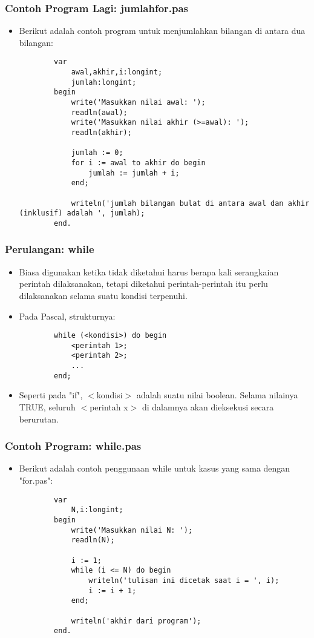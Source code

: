 \documentclass{beamer}
\begin{document}
\begin{frame}[fragile]
\frametitle{Contoh Program Lagi: jumlahfor.pas}
\begin{itemize}
	\item Berikut adalah contoh program untuk menjumlahkan bilangan di antara dua bilangan:
	\begin{lstlisting}
		var
		    awal,akhir,i:longint;
		    jumlah:longint;
		begin
		    write('Masukkan nilai awal: ');
		    readln(awal);
		    write('Masukkan nilai akhir (>=awal): ');
		    readln(akhir);
		
		    jumlah := 0;
		    for i := awal to akhir do begin
		        jumlah := jumlah + i;
		    end;
		
		    writeln('jumlah bilangan bulat di antara awal dan akhir (inklusif) adalah ', jumlah);
		end.
	\end{lstlisting}
\end{itemize}
\end{frame}

\begin{frame}[fragile]
\frametitle{Perulangan: while}
\begin{itemize}
	\item Biasa digunakan ketika tidak diketahui harus berapa kali serangkaian perintah dilaksanakan, tetapi diketahui perintah-perintah itu perlu dilaksanakan selama suatu kondisi terpenuhi.
	\item Pada Pascal, strukturnya:
	\begin{lstlisting}
		while (<kondisi>) do begin
		    <perintah 1>;
		    <perintah 2>;
		    ...
		end;
	\end{lstlisting}
	\item Seperti pada "if", $<$kondisi$>$ adalah suatu nilai boolean. Selama nilainya TRUE, seluruh $<$perintah x$>$ di dalamnya akan dieksekusi secara berurutan.
\end{itemize}
\end{frame}

\begin{frame}[fragile]
\frametitle{Contoh Program: while.pas}
\begin{itemize}
	\item Berikut adalah contoh penggunaan while untuk kasus yang sama dengan "for.pas":
	\begin{lstlisting}
		var
		    N,i:longint;
		begin
		    write('Masukkan nilai N: ');
		    readln(N);
		
		    i := 1;
		    while (i <= N) do begin
		        writeln('tulisan ini dicetak saat i = ', i);
		        i := i + 1;
		    end;
		
		    writeln('akhir dari program');
		end.
	\end{lstlisting}
\end{itemize}
\end{frame}
\end{document}
